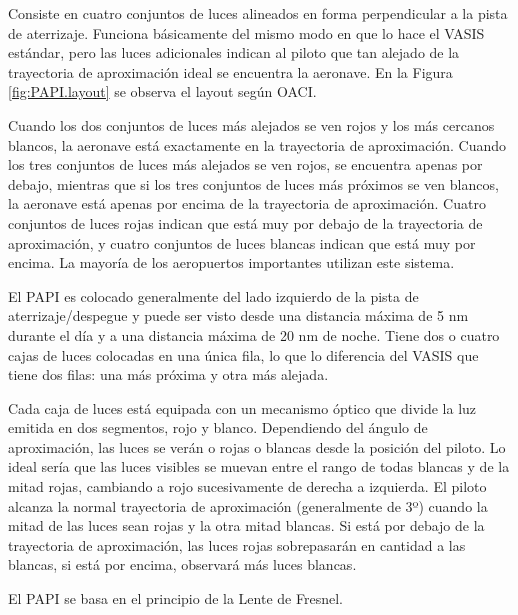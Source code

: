 
Consiste en cuatro conjuntos de luces alineados en forma perpendicular a la pista de aterrizaje.
Funciona básicamente del mismo modo en que lo hace el VASIS estándar, pero las luces adicionales
indican al piloto que tan alejado de la trayectoria de aproximación ideal se encuentra la aeronave.
En la Figura \ref{fig:PAPI.layout} se observa el layout según OACI.

Cuando los dos conjuntos de luces más alejados se ven rojos y los más cercanos blancos,
la aeronave está exactamente en la trayectoria de aproximación.
Cuando los tres conjuntos de luces más
alejados se ven rojos, se encuentra apenas por debajo, mientras que si los tres conjuntos de luces
más próximos se ven blancos, la aeronave está apenas por encima de la trayectoria de aproximación.
Cuatro conjuntos de luces rojas indican que está muy por debajo de la trayectoria de aproximación,
y cuatro conjuntos de luces blancas indican que está muy por encima. La mayoría de los aeropuertos
importantes utilizan este sistema.

El PAPI es colocado generalmente del lado izquierdo de la pista de aterrizaje/despegue y puede
ser visto desde una distancia máxima de 5 nm durante el día y a una distancia máxima de
20 nm de noche. Tiene dos o cuatro cajas de luces colocadas en una única fila, lo que lo
diferencia del VASIS que tiene dos filas: una más próxima y otra más alejada.

Cada caja de luces está equipada con un mecanismo óptico que divide la luz emitida en dos
segmentos, rojo y blanco. Dependiendo del ángulo de aproximación, las luces se verán o rojas o
blancas desde la posición del piloto. Lo ideal sería que las luces visibles se muevan entre el rango de
todas blancas y de la mitad rojas, cambiando a rojo sucesivamente de derecha a izquierda. El piloto
alcanza la normal trayectoria de aproximación (generalmente de 3º) cuando la mitad de las
luces sean rojas y la otra mitad blancas. Si está por debajo de la trayectoria de aproximación, las
luces rojas sobrepasarán en cantidad a las blancas, si está por encima, observará más luces blancas.

El PAPI se basa en el principio de la Lente de Fresnel.

